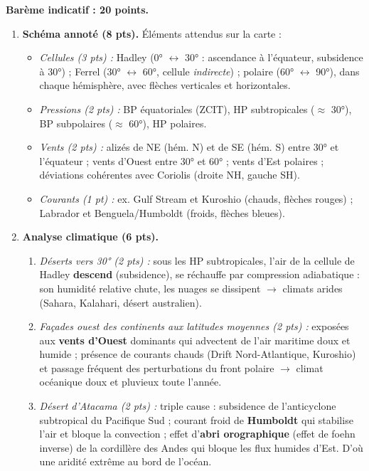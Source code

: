 \documentclass[11pt]{article}
\begin{document}
\begin{corrige}
\textbf{Barème indicatif : 20 points.}

\begin{enumerate}
    \item \textbf{Schéma annoté (8 pts).} Éléments attendus sur la carte :
    \begin{itemize}
        \item \emph{Cellules (3 pts) :} Hadley (0° $\leftrightarrow$ 30° : ascendance à l'équateur, subsidence à 30°) ; Ferrel (30° $\leftrightarrow$ 60°, cellule \emph{indirecte}) ; polaire (60° $\leftrightarrow$ 90°), dans chaque hémisphère, avec flèches verticales et horizontales.
        \item \emph{Pressions (2 pts) :} BP équatoriales (ZCIT), HP subtropicales ($\approx$ 30°), BP subpolaires ($\approx$ 60°), HP polaires.
        \item \emph{Vents (2 pts) :} alizés de NE (hém. N) et de SE (hém. S) entre 30° et l'équateur ; vents d'Ouest entre 30° et 60° ; vents d'Est polaires ; déviations cohérentes avec Coriolis (droite NH, gauche SH).
        \item \emph{Courants (1 pt) :} ex. Gulf Stream et Kuroshio (chauds, flèches rouges) ; Labrador et Benguela/Humboldt (froids, flèches bleues).
    \end{itemize}
    \item \textbf{Analyse climatique (6 pts).}
    \begin{enumerate}
        \item \emph{Déserts vers 30° (2 pts) :} sous les HP subtropicales, l'air de la cellule de Hadley \textbf{descend} (subsidence), se réchauffe par compression adiabatique : son humidité relative chute, les nuages se dissipent $\rightarrow$ climats arides (Sahara, Kalahari, désert australien).
        \item \emph{Façades ouest des continents aux latitudes moyennes (2 pts) :} exposées aux \textbf{vents d'Ouest} dominants qui advectent de l'air maritime doux et humide ; présence de courants chauds (Drift Nord-Atlantique, Kuroshio) et passage fréquent des perturbations du front polaire $\rightarrow$ climat océanique doux et pluvieux toute l'année.
        \item \emph{Désert d'Atacama (2 pts) :} triple cause : subsidence de l'anticyclone subtropical du Pacifique Sud ; courant froid de \textbf{Humboldt} qui stabilise l'air et bloque la convection ; effet d'\textbf{abri orographique} (effet de foehn inverse) de la cordillère des Andes qui bloque les flux humides d'Est. D'où une aridité extrême au bord de l'océan.

\end{enumerate}
\end{enumerate}
\end{corrige}
\end{document}
